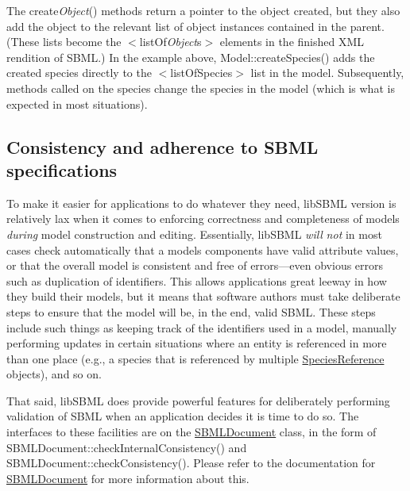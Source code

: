 The {\ttfamily create{\itshape Object}()} methods return a pointer to the object created, but they also add the object to the relevant list of object instances contained in the parent. (These lists become the {\ttfamily $<$list\+Of{\itshape Object}s$>$} elements in the finished X\+ML rendition of S\+B\+ML.) In the example above, Model\+::create\+Species() adds the created species directly to the {\ttfamily $<$list\+Of\+Species$>$} list in the model. Subsequently, methods called on the species change the species in the model (which is what is expected in most situations).\hypertarget{class_model_model-checking}{}\subsection{Consistency and adherence to S\+B\+M\+L specifications}\label{class_model_model-checking}
To make it easier for applications to do whatever they need, lib\+S\+B\+ML version  is relatively lax when it comes to enforcing correctness and completeness of models {\itshape during} model construction and editing. Essentially, lib\+S\+B\+ML {\itshape will} {\itshape not} in most cases check automatically that a model\textquotesingle{}s components have valid attribute values, or that the overall model is consistent and free of errors---even obvious errors such as duplication of identifiers. This allows applications great leeway in how they build their models, but it means that software authors must take deliberate steps to ensure that the model will be, in the end, valid S\+B\+ML. These steps include such things as keeping track of the identifiers used in a model, manually performing updates in certain situations where an entity is referenced in more than one place (e.\+g., a species that is referenced by multiple \hyperlink{class_species_reference}{Species\+Reference} objects), and so on.

That said, lib\+S\+B\+ML does provide powerful features for deliberately performing validation of S\+B\+ML when an application decides it is time to do so. The interfaces to these facilities are on the \hyperlink{class_s_b_m_l_document}{S\+B\+M\+L\+Document} class, in the form of S\+B\+M\+L\+Document\+::check\+Internal\+Consistency() and S\+B\+M\+L\+Document\+::check\+Consistency(). Please refer to the documentation for \hyperlink{class_s_b_m_l_document}{S\+B\+M\+L\+Document} for more information about this.

